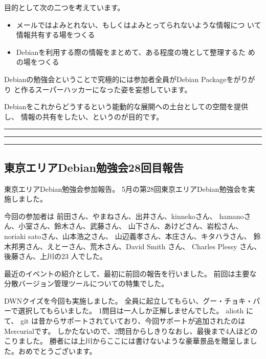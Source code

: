\documentclass[mingoth,a4paper]{jsarticle}
\begin{document}
 目的として次の二つを考えています。

 \begin{itemize}
 \item メールではよみとれない、もしくはよみとってられないような情報につ
       いて情報共有する場をつくる
 \item Debianを利用する際の情報をまとめて、ある程度の塊として整理するた
       めの場をつくる
 \end{itemize}

 Debianの勉強会ということで究極的には参加者全員がDebian Packageをがりがり
 と作るスーパーハッカーになった姿を妄想しています。

 Debianをこれからどうするという能動的な展開への土台としての空間を提供し、
 情報の共有をしたい、というのが目的です。


\newpage

\begin{minipage}[b]{0.2\hsize}
 \colorbox{dancerlightblue}{}
\end{minipage}
\begin{minipage}[b]{0.8\hsize}
\hrule
\vspace{2mm}
\hrule
\tableofcontents
\vspace{2mm}
\hrule
\end{minipage}



\subsection{東京エリアDebian勉強会28回目報告}

東京エリアDebian勉強会参加報告。
5月の第28回東京エリアDebian勉強会を実施しました。

今回の参加者は
前田さん、やまねさん、出井さん、kinnekoさん、
hamanoさん、小室さん、鈴木さん、武藤さん、
山下さん、あけどさん、岩松さん、
noriaki satoさん、山本浩之さん、
山辺義孝さん、本庄さん、キタハラさん、
鈴木邦男さん、えとーさん、荒木さん、David Smith さん、
Charles Plessy さん、後藤さん、上川の23 人でした。

最近のイベントの紹介として、最初に前回の報告を行いました。
前回は主要な分散バージョン管理ツールについての特集でした。

DWNクイズを今回も実施しました。
全員に起立してもらい、グー・チョキ・パーで選択してもらいました。
1問目は一人しか正解しませんでした。
alioth にて、 git は昔からサポートされていており、今回サポートが追加されたのはMercurialです。
しかたないので、2問目からしきりなおし、最後まで4人ほどのこりました。
勝者には上川からここには書けないような豪華景品を贈呈しました。おめでとうございます。
\end{document}

